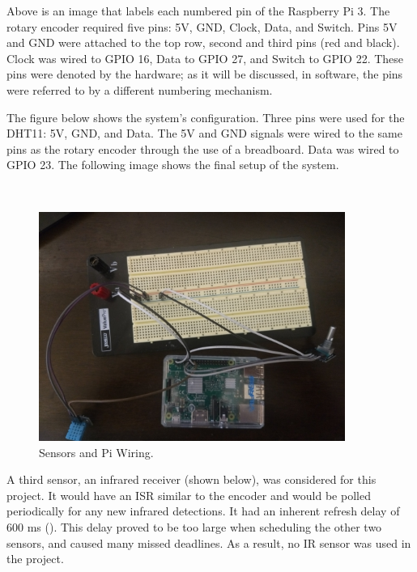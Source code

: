 \documentclass[letterpaper, 12pt]{article}
\begin{document}
\indent Above is an image that labels each numbered pin of the Raspberry Pi 3. The rotary encoder required five pins: 5V, GND, Clock, Data, and Switch.  Pins 5V and GND were attached to the top row, second and third pins (red and black). Clock was wired to GPIO 16, Data to GPIO 27, and Switch to GPIO 22.  These pins were denoted by the hardware; as it will be discussed, in software, the pins were referred to by a different numbering mechanism.

\indent The figure below shows the system's configuration. Three pins were used for the DHT11: 5V, GND, and Data.  The 5V and GND signals were wired to the same pins as the rotary encoder through the use of a breadboard.  Data was wired to GPIO 23.  The following image shows the final setup of the system.

~\newline
\begin{figure}[H]
	\centering
	\includegraphics[width=10cm,keepaspectratio]{circuit.jpg}
	\caption[Circuit]{Sensors and Pi Wiring.}
	\label{fig:Circuit}
\end{figure}

\indent A third sensor, an infrared receiver (shown below), was considered for this project. It would have an ISR similar to the encoder and would be polled periodically for any new infrared detections. It had an inherent refresh delay of 600 ms (\cite{sunfounder2018}).  This delay proved to be too large when scheduling the other two sensors, and caused many missed deadlines.  As a result, no IR sensor was used in the project.
\end{document}
